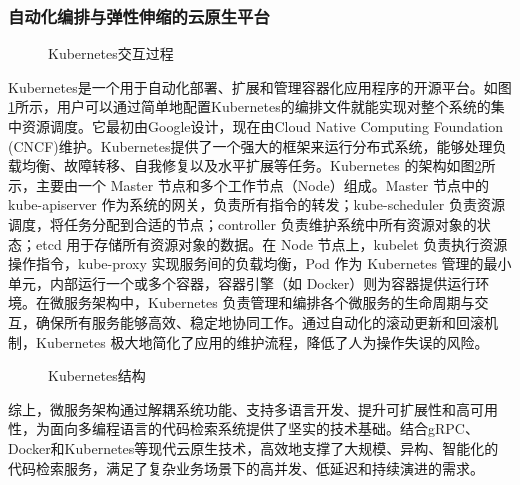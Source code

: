 \documentclass[UTF8,a4paper,12pt]{ctexart}
\numberwithin{equation}{section}
\begin{document}
\subsubsection{自动化编排与弹性伸缩的云原生平台}
\begin{figure}[H]
	\caption{Kubernetes交互过程}
	\label{k8s_m}
\end{figure}
Kubernetes\cite{ref21}是一个用于自动化部署、扩展和管理容器化应用程序的开源平台。如图\ref{k8s_m}所示，用户可以通过简单地配置Kubernetes的编排文件就能实现对整个系统的集中资源调度。它最初由Google设计，现在由Cloud Native Computing Foundation (CNCF)维护。Kubernetes提供了一个强大的框架来运行分布式系统，能够处理负载均衡、故障转移、自我修复以及水平扩展等任务。Kubernetes 的架构如图\ref{k8s_structure}所示，主要由一个 Master 节点和多个工作节点（Node）组成。Master 节点中的 kube-apiserver 作为系统的网关，负责所有指令的转发；kube-scheduler 负责资源调度，将任务分配到合适的节点；controller 负责维护系统中所有资源对象的状态；etcd 用于存储所有资源对象的数据。在 Node 节点上，kubelet 负责执行资源操作指令，kube-proxy 实现服务间的负载均衡，Pod 作为 Kubernetes 管理的最小单元，内部运行一个或多个容器，容器引擎（如 Docker）则为容器提供运行环境。在微服务架构中，Kubernetes 负责管理和编排各个微服务的生命周期与交互，确保所有服务能够高效、稳定地协同工作。通过自动化的滚动更新和回滚机制，Kubernetes 极大地简化了应用的维护流程，降低了人为操作失误的风险。\par
\begin{figure}[H]
	\caption{Kubernetes结构}
	\label{k8s_structure}
\end{figure}
综上，微服务架构通过解耦系统功能、支持多语言开发、提升可扩展性和高可用性，为面向多编程语言的代码检索系统提供了坚实的技术基础。结合gRPC、Docker和Kubernetes等现代云原生技术，高效地支撑了大规模、异构、智能化的代码检索服务，满足了复杂业务场景下的高并发、低延迟和持续演进的需求。
\end{document}
